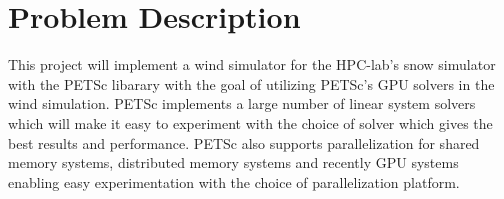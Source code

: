 \section*{Problem Description}

This project will implement a wind simulator for the HPC-lab's snow simulator
with the PETSc libarary with the goal of utilizing PETSc's GPU solvers in the
wind simulation.
PETSc implements a large number of linear system solvers which will make
it easy to experiment with the choice of solver which gives the best results and
performance. PETSc also supports parallelization for shared memory systems,
distributed memory systems and recently GPU systems enabling easy experimentation
with the choice of parallelization platform.
